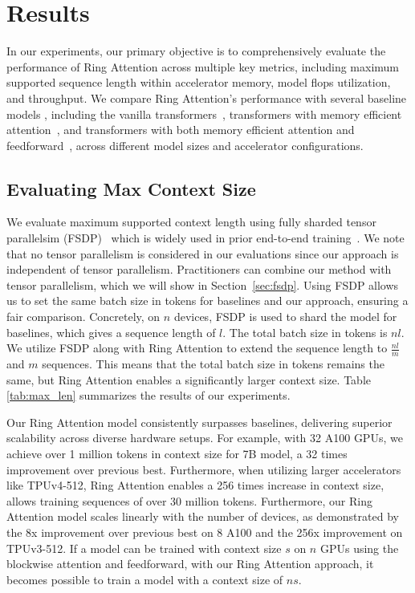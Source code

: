 \section{Results}
\label{sec:experiment}
In our experiments, our primary objective is to comprehensively evaluate the performance of {Ring Attention} across multiple key metrics, including maximum supported sequence length within accelerator memory, model flops utilization, and throughput. We compare {Ring Attention}'s performance with several baseline models , including the vanilla transformers~\citep{vaswani2017attention}, transformers with memory efficient attention~\citep{rabe2021self}, and transformers with both memory efficient attention and feedforward~\citep{liu2023blockwise}, across different model sizes and accelerator configurations.

\subsection{Evaluating Max Context Size}
\label{sec:max_context_size}
We evaluate maximum supported context length using fully sharded tensor parallelsim (FSDP)~\citep{fbFullySharded} which is widely used in prior end-to-end training~\citep{touvron2023llama,openllama2023}. We note that no tensor parallelism is considered in our evaluations since our approach is independent of tensor parallelism. Practitioners can combine our method with tensor parallelism, which we will show in Section~\ref{sec:fsdp}.
Using FSDP allows us to set the same batch size in tokens for baselines and our approach, ensuring a fair comparison. Concretely, on $n$ devices, FSDP is used to shard the model for baselines, which gives a sequence length of $l$. The total batch size in tokens is $nl$. We utilize FSDP along with {Ring Attention} to extend the sequence length to $\frac{nl}{m}$ and $m$ sequences. This means that the total batch size in tokens remains the same, but {Ring Attention} enables a significantly larger context size. Table \ref{tab:max_len} summarizes the results of our experiments.

Our {Ring Attention} model consistently surpasses baselines, delivering superior scalability across diverse hardware setups. For example, with 32 A100 GPUs, we achieve over 1 million tokens in context size for 7B model, a 32 times improvement over previous best. Furthermore, when utilizing larger accelerators like TPUv4-512, {Ring Attention} enables a 256 times increase in context size, allows training sequences of over 30 million tokens. Furthermore, our {Ring Attention} model scales linearly with the number of devices, as demonstrated by the 8x improvement over previous best on 8 A100 and the 256x improvement on TPUv3-512. If a model can be trained with context size $s$ on $n$ GPUs using the blockwise attention and feedforward, with our {Ring Attention} approach, it becomes possible to train a model with a context size of $ns$.

